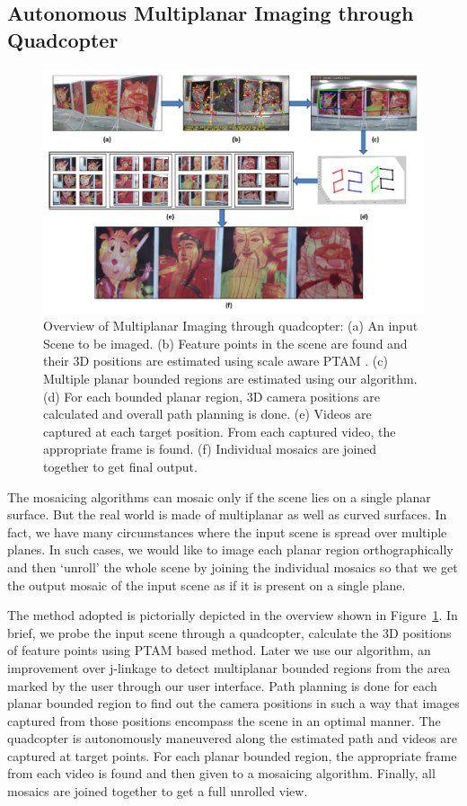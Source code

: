 \subsection{Autonomous Multiplanar Imaging through Quadcopter}
\begin{figure}[h!]
\centering
\includegraphics[width=0.98\linewidth]{figures/multiplanar/workflow}
\caption[Overflow of autonomous multiplanar imaging through quadcopter]{Overview
of Multiplanar Imaging through quadcopter:
(a) An input Scene to be imaged.
(b) Feature points in the scene are found and their 3D positions are estimated
using scale aware PTAM \cite{Engel12}. (c) Multiple planar bounded regions are
estimated using our algorithm. (d) For each bounded planar region, 3D camera
positions are calculated and overall path planning is done. (e) Videos are
captured at each target position. From each captured video, the appropriate
frame is found. (f) Individual mosaics are joined together to get final output.}
\label{fig:multiplanar_workflow}
\end{figure}

The mosaicing algorithms can mosaic only if the scene lies on a single planar
surface. But the real world is made of multiplanar as well as curved surfaces.
In fact, we have many circumstances where the input scene is spread over
multiple planes. In such cases, we would like to image each planar region
orthographically and then `unroll' the whole scene by joining the individual
mosaics so that we get the output mosaic of the input scene as if it is present
on a single plane.

The method adopted is pictorially depicted in the overview shown in
Figure~\ref{fig:multiplanar_workflow}. In brief, we probe the input scene through a quadcopter, calculate the 3D positions of feature points
using PTAM based method\cite{engel}. Later we use our algorithm, an improvement
over j-linkage\cite{jlinkage} to detect multiplanar bounded regions from the area
marked by the user through our user interface. Path planning is done for each
planar bounded region to find out the camera positions in such a way
that images captured from those positions encompass the scene in an optimal manner.
The quadcopter is autonomously maneuvered along the estimated path and videos
are captured at target points. For each planar bounded region, the appropriate
frame from each video is found and then given to a mosaicing algorithm. 
Finally, all mosaics are joined together to get a full unrolled view.

